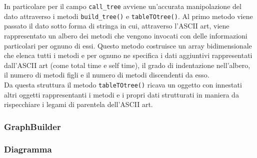 	In particolare per il campo \texttt{call\_tree} avviene un'accurata manipolazione del dato attraverso i metodi \texttt{build\_tree()} e \texttt{tableTOtree()}. Al primo metodo viene  passato il dato sotto forma di stringa in cui, attraverso l'ASCII art, viene rappresentato un albero dei metodi che vengono invocati con delle informazioni particolari per ognuno di essi. Questo metodo costruisce un array bidimensionale che elenca tutti i metodi e per ognuno ne specifica i dati aggiuntivi rappresentati dall'ASCII art (come total time e self time), il grado di indentazione nell'albero, il numero di metodi figli e il numero di metodi discendenti da esso. \\ Da questa struttura il metodo \texttt{tableTOtree()} ricava un oggetto con innestati altri oggetti rappresentanti i metodi e i propri dati strutturati in maniera da rispecchiare i legami di parentela dell'ASCII art.
\subsubsection{GraphBuilder}
\label{sec:GraphBuilder}
	\subsubsection{Diagramma}


